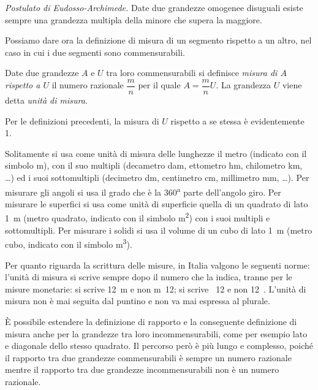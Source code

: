 \noindent \emph{Postulato di Eudosso-Archimede.} Date due grandezze 
omogenee disuguali esiste sempre una grandezza multipla della minore 
che supera la maggiore.\vspace{8pt}

Possiamo dare ora la definizione di misura di un segmento rispetto a 
un altro, nel caso in cui i due segmenti sono commensurabili.
\begin{definizione}
Date due grandezze $A$ e $U$ tra loro commensurabili si definisce 
\emph{misura di $A$ rispetto a $U$} il numero razionale 
$\dfrac{m}{n}$ per il quale $A=\dfrac{m}{n}U$. La grandezza $U$ viene 
detta \emph{unità di misura}.
\end{definizione}

Per le definizioni precedenti, la misura di $U$ rispetto a se stessa 
è evidentemente 1.

Solitamente si usa come unità di misura delle lunghezze il metro 
(indicato con il simbolo m), con il suo multipli (decametro dam, 
ettometro hm, chilometro km, \ldots{}) ed i suoi sottomultipli 
(decimetro dm, centimetro cm, millimetro mm, \ldots{}). Per misurare 
gli angoli si usa il grado che è la 360\textsuperscript{a} parte 
dell'angolo giro. Per misurare le superfici si usa come unità di 
superficie quella di un quadrato di lato 1~m (metro quadrato, 
indicato con il simbolo m\textsuperscript{2}) con i suoi multipli e 
sottomultipli. Per misurare i solidi si usa il volume di un cubo di 
lato 1~m (metro cubo, indicato con il simbolo m\textsuperscript{3}).

Per quanto riguarda la scrittura delle misure, in Italia valgono le 
seguenti norme: l'unità di misura si scrive sempre dopo il numero che 
la indica, tranne per le misure monetarie: si scrive 12~m e non m~12; 
si scrive \officialeuro~12 e non 12~\officialeuro. L'unità di misura 
non è mai seguita dal puntino e non va mai espressa al plurale.

\`E possibile estendere la definizione di rapporto e la conseguente 
definizione di misura anche per la grandezze tra loro 
incommensurabili, come per esempio lato e diagonale dello stesso 
quadrato. Il percorso però è più lungo e complesso, poiché il 
rapporto tra due grandezze commensurabili è sempre un numero razionale 
mentre il rapporto tra due grandezze incommensurabili non è un numero 
razionale.

